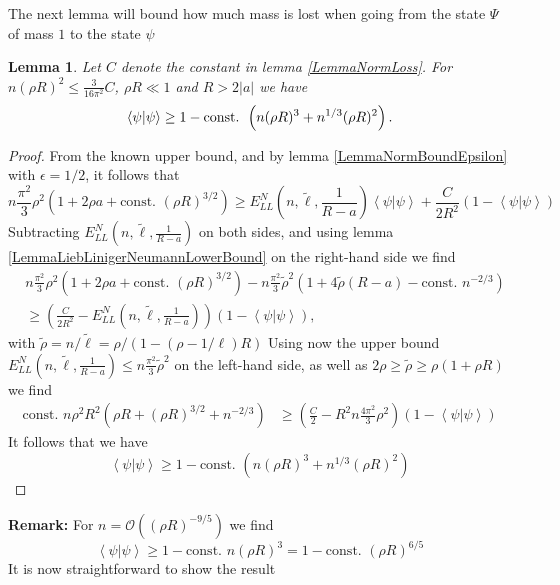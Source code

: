 \documentclass[a4paper,11pt]{article}
\newcommand{\abs}[1]{\left\lvert #1 \right\rvert}
\renewcommand{\braket}[1]{\left\langle#1\right\rangle}
\newtheorem{lemma}{Lemma}
\numberwithin{equation}{section}
\begin{document}
	
	The next lemma will bound how much mass is lost when going from the state $ \Psi $ of mass $ 1 $ to the state $ \psi $
	\begin{lemma}\label{LemmaImprovedMassBound}
		Let $ C $ denote the constant in lemma \ref{LemmaNormLoss}. For $ n(\rho R)^2\leq  \frac{3}{16\pi^2}C $, $ \rho R\ll 1 $ and $ R>2\abs{a} $ we have
		\begin{equation}\label{EqImprovedMassBound}
		\begin{aligned}
		\braket{\psi|\psi} \geq 1-\textnormal{const. }\left(n(\rho R)^3+n^{1/3}(\rho R)^2\right).
		\end{aligned}
		\end{equation}
	\end{lemma}
	\begin{proof}
		From the known upper bound, and by lemma \ref{LemmaNormBoundEpsilon} with $ \epsilon=1/2 $, it follows that 
		\begin{equation}
		n\frac{\pi^2}{3}\rho^2\left(1+2\rho a+\text{const. }(\rho R)^{3/2}\right)\geq E_{LL}^N \left(n,\tilde{\ell},\frac{1}{R-a}\right)\braket{\psi|\psi}+ \frac{C}{2R^2}(1-\braket{\psi|\psi})
		\end{equation}
		Subtracting $ E_{LL}^N \left(n,\tilde{\ell},\frac{1}{R-a}\right) $ on both sides, and using lemma \ref{LemmaLiebLinigerNeumannLowerBound} on the right-hand side we find\begin{equation}
		\begin{aligned}
		&n\frac{\pi^2}{3}\rho^2\left(1+2\rho a+\text{const. }(\rho R)^{3/2}\right)-n\frac{\pi^2}{3}\tilde{\rho}^2\left(1+4\tilde{\rho} (R-a)-\text{const. }n^{-2/3}\right)\\
		&\geq  \left(\frac{C}{2R^2}-E_{LL}^N \left(n,\tilde{\ell},\frac{1}{R-a}\right)\right)(1-\braket{\psi|\psi}),
		\end{aligned}
		\end{equation}
		with $ \tilde{\rho}=n/\tilde{\ell}=\rho/(1-(\rho-1/\ell)R)  $
		Using now the upper bound $ E^N_{LL}\left(n,\tilde{\ell},\frac{1}{R-a}\right)\leq n\frac{\pi^2}{3}\tilde{\rho}^2 $ on the left-hand side, as well as $ 2\rho \geq\tilde{\rho}\geq \rho(1+\rho R)$ we find
		\begin{equation}
		\begin{aligned}
		\text{const. }n\rho^2R^2\left(\rho R+(\rho R)^{3/2}+n^{-2/3}\right)&\geq \left(\frac{C}{2}-R^2n\frac{4\pi^2}{3}\rho^2\right)\left(1-\braket{\psi|\psi}\right)
		\end{aligned}
		\end{equation}
		It follows that we have \begin{equation}
		\braket{\psi|\psi}\geq 1-\text{const. }\left(n(\rho R)^3+n^{1/3}(\rho R)^2\right)
		\end{equation}
	\end{proof}
	\textbf{Remark:} For $ n=\mathcal{O}((\rho R)^{-9/5}) $ we find \begin{equation}
	\braket{\psi|\psi}\geq 1-\text{const. }n(\rho R)^3=1-\text{const. }(\rho R)^{6/5}
	\end{equation}
	It is now straightforward to show the result
	
\end{document}
